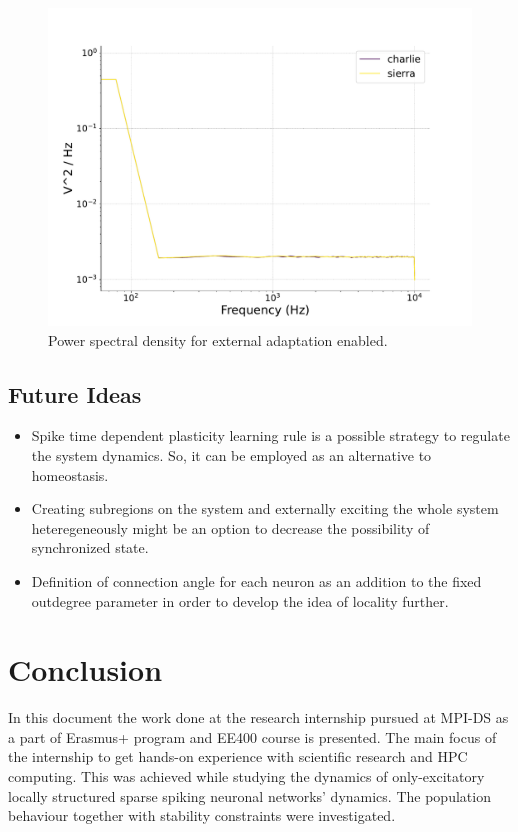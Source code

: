 \documentclass[a4paper,12pt]{article}
\begin{document}
\begin{figure}[H] 
    \centering
    \includegraphics[width=0.8\linewidth]{nu_ext_76PSD_homeostasis_foxtrot.pdf}
    \caption{Power spectral density for external adaptation enabled.}
    \label{foxtrot76PSD}
\end{figure}

\subsection{Future Ideas}
\begin{itemize}
    \item Spike time dependent plasticity learning rule is a possible strategy to regulate the system dynamics. So, it can be employed as an alternative to homeostasis.
    \item Creating subregions on the system and externally exciting the whole system heteregeneously might be an option to decrease the possibility of synchronized state.
    \item Definition of connection angle for each neuron as an addition to the fixed outdegree parameter in order to develop the idea of locality further.
\end{itemize}
\section{Conclusion}
In this document the work done at the research internship pursued at MPI-DS as a part of Erasmus+ program and EE400 course is presented. The main focus of the internship to get hands-on experience with scientific research and HPC computing. This was achieved while studying the dynamics of only-excitatory locally structured sparse spiking neuronal networks' dynamics. The population behaviour together with stability constraints were investigated.

 
\end{document}
